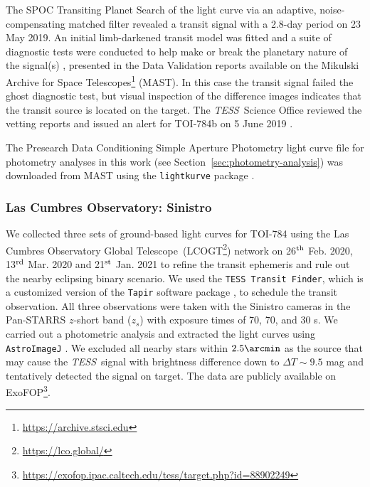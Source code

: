 \documentclass[twocolumn]{aastex631}
\newcommand{\code}[1]{{\texttt{#1}}}
\newcommand{\tess}{\textit{TESS}\ }
\begin{document}
The SPOC Transiting Planet Search \citep[TPS;][]{Jenkins2002, Jenkins2010, 2020TPSkdph} of the light curve via an adaptive, noise-compensating matched filter revealed a transit signal with a 2.8-day period on 23 May 2019. An initial limb-darkened transit model was fitted \citep{Li:DVmodelFit2019} and a suite of diagnostic tests were conducted to help make or break the planetary nature of the signal(s) \citep{Twicken:DVdiagnostics2018}, presented in the Data Validation reports available on the Mikulski Archive for Space Telescopes\footnote{\url{https://archive.stsci.edu}} (MAST). In this case the transit signal failed the ghost diagnostic test, but visual inspection of the difference images indicates that the transit source is located on the target. The \tess Science Office reviewed the vetting reports and issued an alert for TOI-784b on 5 June 2019 \citep{guerrero:TOIs2021ApJS}. 

The Presearch Data Conditioning Simple Aperture Photometry light curve file \citep[PDCSAP flux;][]{Stumpe2012, Smith2012, Stumpe2014} for photometry analyses in this work (see Section~\ref{sec:photometry-analysis}) was downloaded from MAST using the \code{lightkurve} package \citep{Lightkurve}.



\subsubsection{Las Cumbres Observatory: Sinistro}
\label{sec:LCO-Sinistro}

We collected three sets of ground-based light curves for TOI-784 using the Las Cumbres Observatory Global Telescope\ (LCOGT\footnote{\url{https://lco.global/}}) network \citep{Brown2013} on 26$^{\rm th}$ Feb. 2020, 13$^{\rm rd}$ Mar. 2020 and 21$^{\rm st}$ Jan. 2021 to refine the transit ephemeris and rule out the nearby eclipsing binary scenario. We used the {\tt TESS Transit Finder}, which is a customized version of the {\tt Tapir} software package \citep{Jensen2013}, to schedule the transit observation. All three observations were taken with the Sinistro cameras in the Pan-STARRS $z$-short band ($z_{s}$) with exposure times of 70, 70, and 30 s. We carried out a photometric analysis and extracted the light curves using {\tt AstroImageJ} \citep{Collins2017}. We excluded all nearby stars within $2.5\arcmin$ as the source that may cause the \tess signal with brightness difference down to $ \Delta T \sim 9.5 $ mag and tentatively detected the signal on target. The data are publicly available on ExoFOP\footnote{\url{https://exofop.ipac.caltech.edu/tess/target.php?id=88902249}}.
\end{document}
